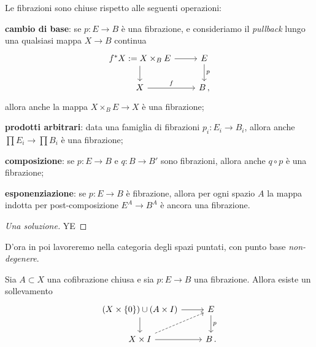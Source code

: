 \begin{exercise}
	Le fibrazioni sono chiuse rispetto alle seguenti operazioni:
	\begin{rmnumerate}	
	\item \textbf{cambio di base}:
	se $p:E \to B$ è una fibrazione,
	e consideriamo il \emph{pullback}
	lungo una qualsiasi mappa $X \to B$ continua 
	\begin{equation*}
		\begin{tikzcd}
			f^*X := X \times_{B} E \ar[d] \ar[r] & E \ar[d, "p"] \\
			X \ar[r, "f"] & B\,,
		\end{tikzcd}
	\end{equation*}
	allora anche la mappa $X \times_{B} E \to X$ è una fibrazione;
	
	\item \textbf{prodotti arbitrari}: data una famiglia di fibrazioni $p_{i}:E_{i} \to B_{i}$,
	allora anche $\prod E_{i} \to \prod B_{i}$ è una fibrazione;
	
	\item \textbf{composizione}: se $p: E \to  B$ e $q:B \to B'$ sono fibrazioni,
	allora anche $q \circ p$ è una fibrazione; 
	
	\item \textbf{esponenziazione}:
	se $p:E \to B$ è fibrazione,
	allora per ogni spazio $A$ la mappa indotta per post-composizione
	$E^{A} \to B^{A}$ è ancora una fibrazione.
	\end{rmnumerate}
	\begin{proof}[Una soluzione]
		YE
	\end{proof}
\end{exercise}

D'ora in poi lavoreremo nella categoria
degli spazi puntati, con punto base \emph{non-degenere}.
\begin{lemma}\label{relative-HLP}
	Sia $A \subset X$ una cofibrazione chiusa
	e sia $p:E \to B$ una fibrazione. Allora esiste un sollevamento
	\begin{equation*}
		\begin{tikzcd}
			(X \times \{0\}) \cup (A \times I) \ar[d] \ar[r] & E \ar[d, "p"] \\
			X \times I \ar[r] \ar[ur,dashed] & B\,.
		\end{tikzcd}
	\end{equation*}
\end{lemma}

